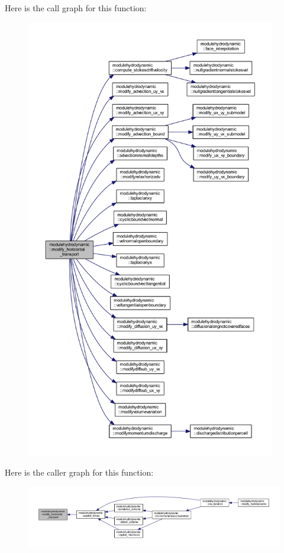 Here is the call graph for this function\+:\nopagebreak
\begin{figure}[H]
\begin{center}
\leavevmode
\includegraphics[height=550pt]{namespacemodulehydrodynamic_a4bfe52cf1e114fade20b4037cfdf542a_cgraph}
\end{center}
\end{figure}
Here is the caller graph for this function\+:\nopagebreak
\begin{figure}[H]
\begin{center}
\leavevmode
\includegraphics[width=350pt]{namespacemodulehydrodynamic_a4bfe52cf1e114fade20b4037cfdf542a_icgraph}
\end{center}
\end{figure}
\mbox{\label{namespacemodulehydrodynamic_a90cfb4d3462f345fb4c6da09ace1521d}} 
